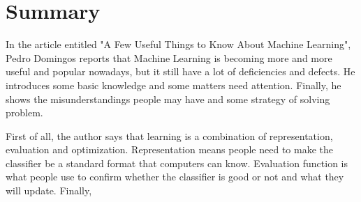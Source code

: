 \documentclass[12pt]{article}
\begin{document}
	\section{Summary}
		\par\qquad In the article entitled "A Few Useful Things to Know About Machine Learning", Pedro Domingos reports that Machine Learning is becoming more and more useful and popular nowadays, but it still have a lot of deficiencies and defects. He introduces some basic knowledge and  some matters need attention. Finally, he shows the misunderstandings people may have and some strategy of solving problem. 
		\par First of all, the author says that learning is a combination of representation, evaluation and optimization. Representation means people need to make the classifier be a standard format that computers can know. Evaluation function is what people use to confirm whether the classifier is good or not and what they will update. Finally, 
\end{document}
